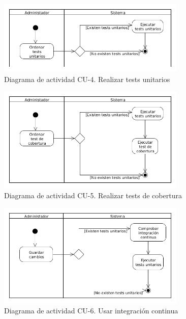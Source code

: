 \begin{figure}[!h]
  \begin{center}
  \includegraphics[width=0.8\textwidth]{imagenes/diagrama_actividad_cu_4.png}
  \caption[diag_act_cu_4]{Diagrama de actividad CU-4. Realizar tests unitarios}
  \label{fig:diag_act_cu_4}
  \end{center}
\end{figure}

\begin{figure}[!h]
  \begin{center}
  \includegraphics[width=0.8\textwidth]{imagenes/diagrama_actividad_cu_5.png}
  \caption[diag_act_cu_5]{Diagrama de actividad CU-5. Realizar tests de cobertura}
  \label{fig:diag_act_cu_5}
  \end{center}
\end{figure}

\begin{figure}[!h]
  \begin{center}
  \includegraphics[width=0.8\textwidth]{imagenes/diagrama_actividad_cu_6.png}
  \caption[diag_act_cu_6]{Diagrama de actividad CU-6. Usar integración continua}
  \label{fig:diag_act_cu_6}
  \end{center}
\end{figure}

